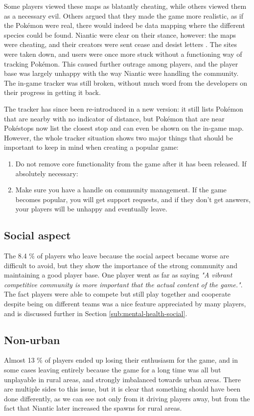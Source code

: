 Some players viewed these maps as blatantly cheating, while others viewed them as a necessary evil. Others argued that they made the game more realistic, as if the Pokémon were real, there would indeed be data mapping where the different species could be found. Niantic were clear on their stance, however: the maps were cheating, and their creators were sent cease and desist letters . The sites were taken down, and users were once more stuck without a functioning way of tracking Pokémon. This caused further outrage among players, and the player base was largely unhappy with the way Niantic were handling the community. The in-game tracker was still broken, without much word from the developers on their progress in getting it back.

The tracker has since been re-introduced in a new version: it still lists Pokémon that are nearby with no indicator of distance, but Pokémon that are near Pokéstops now list the closest stop and can even be shown on the in-game map. However, the whole tracker situation shows two major things that should be important to keep in mind when creating a popular game:

\begin{enumerate}
	\item Do not remove core functionality from the game after it has been released. If absolutely necessary:
	\item Make sure you have a handle on community management. If the game becomes popular, you will get support requests, and if they don't get answers, your players will be unhappy and eventually leave.
\end{enumerate}

\subsection{Social aspect}
The 8.4 \% of players who leave because the social aspect became worse are difficult to avoid, but they show the importance of the strong community and maintaining a good player base. One player went as far as saying \emph{"A vibrant competitive community is more important that the actual content of the game."}. The fact players were able to compete but still play together and cooperate despite being on different teams was a nice feature appreciated by many players, and is discussed further in Section \ref{sub:mental-health-social}.

\subsection{Non-urban}
\label{sec:the-rural-problem}
Almost 13 \% of players ended up losing their enthusiasm for the game, and in some cases leaving entirely because the game for a long time was all but unplayable in rural areas, and strongly imbalanced towards urban areas. There are multiple sides to this issue, but it is clear that something should have been done differently, as we can see not only from it driving players away, but from the fact that Niantic later increased the spawns for rural areas.


